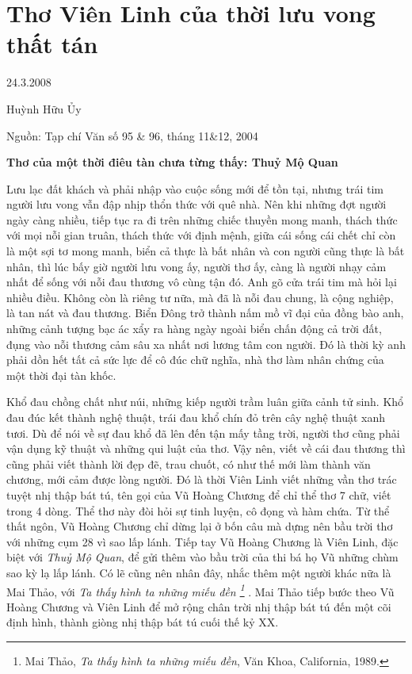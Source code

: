 \documentclass[../main.tex]{subfiles}
\begin{document}
\chapter{Thơ Viên Linh của thời lưu vong thất tán}

\begin{metadata}

\begin{flushright}24.3.2008\end{flushright}

Huỳnh Hữu Ủy

Nguồn: Tạp chí Văn số 95 & 96, tháng 11&12, 2004

\end{metadata}

\begin{multicols}{2}

\textbf{Thơ của một thời điêu tàn chưa từng thấy: Thuỷ Mộ Quan} 

Lưu lạc đất khách và phải nhập vào cuộc sống mới để tồn tại, nhưng trái tim người lưu vong vẫn đập nhịp thổn thức với quê nhà. Nên khi những đợt người ngày càng nhiều, tiếp tục ra đi trên những chiếc thuyền mong manh, thách thức với mọi nỗi gian truân, thách thức với định mệnh, giữa cái sống cái chết chỉ còn là một sợi tơ mong manh, biển cả thực là bất nhân và con người cũng thực là bất nhân, thì lúc bấy giờ người lưu vong ấy, người thơ ấy, càng là người nhạy cảm nhất để sống với nỗi đau thương vô cùng tận đó. Anh gõ cửa trái tim mà hỏi lại nhiều điều. Không còn là riêng tư nữa, mà đã là nỗi đau chung, là cộng nghiệp, là tan nát và đau thương. Biển Đông trở thành nấm mồ vĩ đại của đồng bào anh, những cảnh tượng bạc ác xẩy ra hàng ngày ngoài biển chấn động cả trời đất, đụng vào nỗi thương cảm sâu xa nhất nơi lương tâm con người. Đó là thời kỳ anh phải dồn hết tất cả sức lực để cô đúc chữ nghĩa, nhà thơ làm nhân chứng của một thời đại tàn khốc. 

Khổ đau chồng chất như núi, những kiếp người trầm luân giữa cảnh tử sinh. Khổ đau đúc kết thành nghệ thuật, trái đau khổ chín đỏ trên cây nghệ thuật xanh tươi. Dù để nói về sự đau khổ đã lên đến tận mấy tầng trời, người thơ cũng phải vận dụng kỹ thuật và những qui luật của thơ. Vậy nên, viết về cái đau thương thì cũng phải viết thành lời đẹp đẽ, trau chuốt, có như thế mới làm thành văn chương, mới cảm được lòng người. Đó là thời Viên Linh viết những vần thơ trác tuyệt nhị thập bát tú, tên gọi của Vũ Hoàng Chương để chỉ thể thơ 7 chữ, viết trong 4 dòng. Thể thơ này đòi hỏi sự tinh luyện, cô đọng và hàm chứa. Từ thể thất ngôn, Vũ Hoàng Chương chỉ dừng lại ở bốn câu mà dựng nên bầu trời thơ với những cụm 28 vì sao lấp lánh. Tiếp tay Vũ Hoàng Chương là Viên Linh, đặc biệt với \textit{Thuỷ Mộ Quan}, để gửi thêm vào bầu trời của thi bá họ Vũ những chùm sao kỳ lạ lấp lánh. Có lẽ cũng nên nhân đây, nhắc thêm một người khác nữa là Mai Thảo, với \textit{Ta thấy hình ta những miếu đền \footnote{
Mai Thảo, \textit{Ta thấy hình ta những miếu đền}, Văn Khoa, California, 1989.} }. Mai Thảo tiếp bước theo Vũ Hoàng Chương và Viên Linh để mở rộng chân trời nhị thập bát tú đến một cõi định hình, thành giòng nhị thập bát tú cuối thế kỷ XX. 


\end{multicols}
\end{document}
